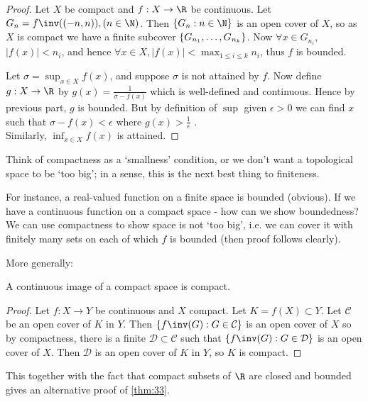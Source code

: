 \begin{proof}
Let $X$ be compact and $f:X \to \R$ be continuous. Let $G_n = f\inv((-n,n)) , (n\in \N)$. Then $\Set{G_n}{n\in \N}$ is an open cover of $X$, so as $X$ is compact we have a finite subcover $\{G_{n_1},\dots, G_{n_k}\}$. Now $\forall x\in G_{n_i}$, $|f(x)| < n_i$, and hence $\forall x\in X, |f(x)| < \max_{1 \leq i  \leq k} n_i$, thus $f$ is bounded.

Let $\sigma = \sup_{x\in X} f(x)$, and suppose $\sigma$ is not attained by $f$. Now define $g: X \to \R$ by $g(x) = \frac{1}{\sigma-f(x)}$ which is well-defined and continuous. Hence by previous part, $g$ is bounded. But by definition of $\sup$ given $\epsilon>0$ we can find $x$ such that $\sigma - f(x)< \epsilon$ where $g(x) > \frac{1}{\epsilon}$ \Lightning. \\
Similarly, $\inf_{x\in X} f(x)$ is attained.
\end{proof}

\begin{remark}
Think of compactness as a `smallness' condition, or we don't want a topological space to be `too big'; in a sense, this is the next best thing to finiteness.

For instance, a real-valued function on a finite space is bounded (obvious). If we have a continuous function on a compact space - how can we show boundedness? We can use compactness to show space is not `too big', i.e. we can cover it with finitely many sets on each of which $f$ is bounded (then proof follows clearly).
\end{remark}

More generally:
\begin{theorem} \label{thm:34}
A continuous image of a compact space is compact.
\end{theorem}

\begin{proof}
Let $f: X \to Y$ be continuous and $X$ compact. Let $K=f(X)\subset Y$. Let $\mathcal{C}$ be an open cover of $K$ in $Y$. Then $\Set{f\inv (G)}{G\in \mathcal{C}}$ is an open cover of $X$ so by compactness, there is a finite $\mathcal{D}\subset\mathcal{C}$ such that $\Set{f\inv (G)}{G\in \mathcal{D}}$ is an open cover of $X$. Then $\mathcal{D}$ is an open cover of $K$ in $Y$, so $K$ is compact.
\end{proof}

\begin{remark}
This together with the fact that compact subsets of $\R$ are closed and bounded gives an alternative proof of \cref{thm:33}.
\end{remark}

